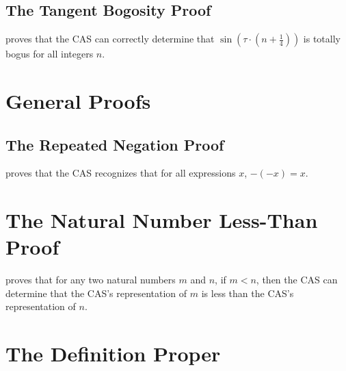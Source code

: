 \documentclass{report}
\begin{document}
\subsection{The Tangent Bogosity Proof}
  proves that the  CAS can correctly determine that \(\sin \left(\tau \cdot \left(n + \frac{1}{4}\right)\right)\) is totally bogus for all integers \(n\).

\section{General Proofs}

\subsection{The Repeated Negation Proof}
  proves that the  CAS recognizes that for all expressions \(x\), \(- \left(- x\right) = x\).


\section{The Natural Number Less-Than Proof}
  proves that for any two natural numbers \(m\) and \(n\), if \(m < n\), then the  CAS can determine that the  CAS's representation of \(m\) is less than the  CAS's representation of \(n\).

\section{The Definition Proper}
\end{document}
